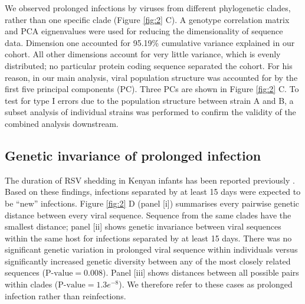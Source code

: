 \documentclass{article} %
\begin{document}
We observed prolonged infections by viruses from different phylogenetic clades, rather than one specific clade 
(Figure \ref{fig:2} C).
A genotype correlation matrix and PCA eignenvalues were used for reducing the dimensionality of sequence data.
Dimension one accounted for 95.19\% cumulative variance explained in our cohort.
All other dimensions account for very little variance, which is evenly distributed; no particular protein coding sequence separated the cohort.
For his reason, in our main analysis, viral population structure was accounted for by the first five principal components (PC). 
Three PCs are shown in Figure \ref{fig:2} C.
To test for type I errors due to the population structure between strain A and B, 
a subset analysis of individual strains was performed to confirm the validity of the combined analysis downstream.


\subsection{Genetic invariance of prolonged infection}
The duration of RSV shedding in Kenyan infants has been reported previously
\citep{okiro2010duration}.
Based on these findings, infections separated by at least 15 days were expected to be ``new'' infections. 
Figure \ref{fig:2} D (panel [i]) summarises every pairwise genetic distance between every viral sequence.
Sequence from the same clades have the smallest distance; panel [ii] shows genetic invariance between viral sequences within the same host for infections separated by at least 15 days. 
There was no significant genetic variation in prolonged viral sequence within individuals versus significantly increased genetic diversity between any of the most closely related sequences ($\text{P-value} = 0.008$).
Panel [iii] shows distances between all possible pairs within clades ($\text{P-value} = 1.3e^{-8}$).
We therefore refer to these cases as prolonged infection rather than reinfections.
\end{document}
